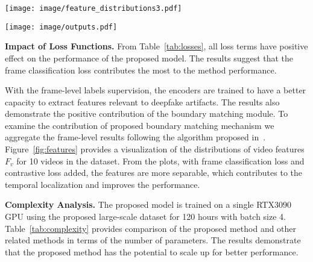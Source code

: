 \documentclass[conference, a4paper]{IEEEtran}
\begin{document}
\begin{figure*}[t]
\centering
\texttt{[image: image/feature\_distributions3.pdf]}
\caption{\textbf{Feature distribution in PCA subspace.} Each point is the features of a video frame.}
\label{fig:features}
\end{figure*}

\begin{figure*}[t]
\centering
\texttt{[image: image/outputs.pdf]}
\caption{\textbf{Visualization of boundary map outputs.} The first column illustrates the modality-wise boundary map outputs for a real video. The rest of the columns illustrate the modality-wise boundary map outputs for the corresponding fake videos. \textit{GT: ground truth} and \textit{mod: modified}.} 
\label{fig:outputs}
\end{figure*}

\noindent \textbf{Impact of Loss Functions.} From Table~\ref{tab:losses}, all loss terms have positive effect on the performance of the proposed model. The results suggest that the frame classification loss contributes the most to the method performance. 

With the frame-level labels supervision, the encoders are trained to have a better capacity to extract features relevant to deepfake artifacts. The results also demonstrate the positive contribution of the boundary matching module. To examine the contribution of proposed boundary matching mechanism we aggregate the frame-level results following the algorithm proposed in~\cite{zhao_temporal_2017}. Figure~\ref{fig:features} provides a visualization of the distributions of video features $F_v$ for 10 videos in the dataset. From the plots, with frame classification loss and contrastive loss added, the features are more separable, which contributes to the temporal localization and improves the performance.

\noindent \textbf{Complexity Analysis.} The proposed model is trained on a single RTX3090 GPU using the proposed large-scale dataset for 120 hours with batch size 4. Table~\ref{tab:complexity} provides comparison of the proposed method and other related methods in terms of the number of parameters. The results demonstrate that the proposed method has the potential to scale up for better performance.
\end{document}
